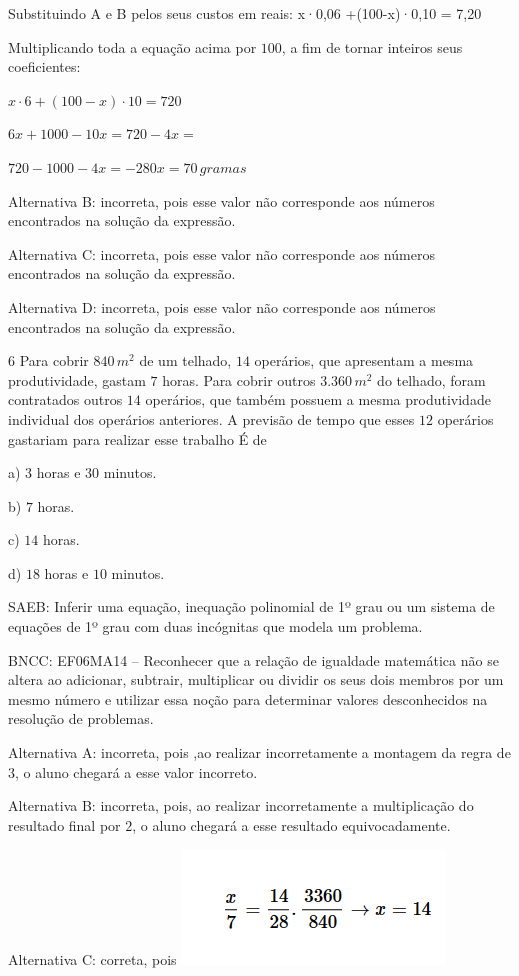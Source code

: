 Substituindo A e B pelos seus custos em reais: x·0,06 +(100-x)·0,10 =
7,20

Multiplicando toda a equação acima por $100$, a fim de tornar inteiros
seus coeficientes: 


$x·6 + (100-x)·10 = 720$

$6x + 1 000 - 10x = 720 -4x =$

$720 - 1000 -4x = -280 x = 70\,gramas$

Alternativa B: incorreta, pois esse valor não corresponde aos números
encontrados na solução da expressão.

Alternativa C: incorreta, pois esse valor não corresponde aos números
encontrados na solução da expressão.

Alternativa D: incorreta, pois esse valor não corresponde aos números
encontrados na solução da expressão.

\num{6}  Para cobrir $840\,m^2$ de um telhado, $14$ operários, que apresentam a
mesma produtividade, gastam $7$ horas. Para cobrir outros $3.360\,m^2$ do
telhado, foram contratados outros $14$ operários, que também possuem a
mesma produtividade individual dos operários anteriores. A previsão de
tempo que esses $12$ operários gastariam para realizar esse trabalho É de

a) $3$ horas e $30$ minutos.

b) $7$ horas.

c) $14$ horas.

d) $18$ horas e $10$ minutos.

SAEB: Inferir uma equação, inequação polinomial de 1º grau ou um sistema
de equações de 1º grau com duas incógnitas que modela um problema.

BNCC: EF06MA14 -- Reconhecer que a relação de igualdade matemática não
se altera ao adicionar, subtrair, multiplicar ou dividir os seus dois
membros por um mesmo número e utilizar essa noção para determinar
valores desconhecidos na resolução de problemas.

Alternativa A: incorreta, pois ,ao realizar incorretamente a montagem da
regra de $3$, o aluno chegará a esse valor incorreto.

Alternativa B: incorreta, pois, ao realizar incorretamente a
multiplicação do resultado final por $2$, o aluno chegará a esse resultado
equivocadamente.

Alternativa C: correta, pois
\includegraphics[width=2.76042in,height=1.20833in]{./imgSAEB_6_MAT/media/image116.png}

